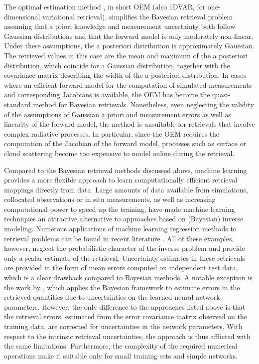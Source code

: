 \documentclass[journal abbreviation, manuscript]{copernicus}
\begin{document}
The optimal estimation method \citep{rodgers}, in short OEM (also 1DVAR, for
one-dimensional variational retrieval), simplifies the Bayesian retrieval
problem assuming that a priori knowledge and measurement uncertainty both follow
Gaussian distributions and that the forward model is only moderately non-linear.
Under these assumptions, the a posteriori distribution is approximately
Gaussian. The retrieved values in this case are the mean and maximum of the a
posteriori distribution, which coincide for a Gaussian distribution, together
with the covariance matrix describing the width of the a posteriori
distribution. In cases where an efficient forward model for the computation of
simulated measurements and corresponding Jacobians is available, the OEM has
become the quasi-standard method for Bayesian retrievals. Nonetheless, even
neglecting the validity of the assumptions of Gaussian a priori and measurement
errors as well as linearity of the forward model, the method is unsuitable for
retrievals that involve complex radiative processes. In particular, since the
OEM requires the computation of the Jacobian of the forward model, 
processes such as surface or cloud scattering become too expensive to model
online during the retrieval.

Compared to the Bayesian retrieval methods discussed above, machine learning
provides a more flexible approach to learn computationally efficient retrieval
mappings directly from data. Large amounts of data available from simulations,
collocated observations or in situ measurements, as well as increasing computational
power to speed up the training, have made machine learning techniques
an attractive alternative to approaches based on (Bayesian) inverse modeling.
Numerous applications of machine learning regression methods to retrieval
problems can be found in recent literature \citep{jimenez, holl, strandgren, wang, hakansson, brath}.
All of these examples, however, neglect the probabilistic character of the
inverse problem and provide only a scalar estimate of the retrieval. Uncertainty
estimates in these retrievals are provided in the form of mean errors computed
on independent test data, which is a clear drawback compared to Bayesian
methods. A notable exception is the work by \citet{aires_2},
which applies the Bayesian framework to estimate errors in the retrieved
quantities due to uncertainties on the learned neural network parameters.
However, the only difference to the approaches listed above is that the
retrieval errors, estimated from the error covariance matrix observed on the
training data, are corrected for uncertainties in the network parameters. With
respect to the intrinsic retrieval uncertainties, the approach is thus afflicted
with the same limitations. Furthermore, the complexity of the required numerical
operations make it suitable only for small training sets and simple networks.
\end{document}
